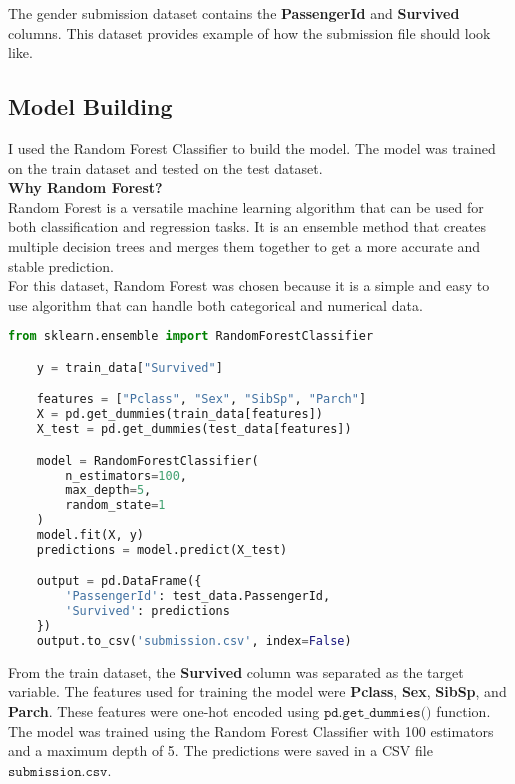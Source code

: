 \documentclass{exam}
\begin{document}
\begin{questions}
\begin{TheSolution}
        The gender submission dataset contains the \textbf{PassengerId} and \textbf{Survived} columns. This dataset provides example of how the submission file should look like.

        \subsection{Model Building}

        I used the Random Forest Classifier to build the model. The model was trained on the train dataset and tested on the test dataset. \\

        \large{\textbf{Why Random Forest?}} \\
        \normalsize
        Random Forest is a versatile machine learning algorithm that can be used for both classification and regression tasks. It is an ensemble method that creates multiple decision trees and merges them together to get a more accurate and stable prediction.\\
        For this dataset, Random Forest was chosen because it is a simple and easy to use algorithm that can handle both categorical and numerical data.

        \newpage

        \begin{lstlisting}[language=Python]
    from sklearn.ensemble import RandomForestClassifier

    y = train_data["Survived"]

    features = ["Pclass", "Sex", "SibSp", "Parch"]
    X = pd.get_dummies(train_data[features])
    X_test = pd.get_dummies(test_data[features])

    model = RandomForestClassifier(
        n_estimators=100,
        max_depth=5,
        random_state=1
    )
    model.fit(X, y)
    predictions = model.predict(X_test)

    output = pd.DataFrame({
        'PassengerId': test_data.PassengerId,
        'Survived': predictions
    })
    output.to_csv('submission.csv', index=False)
        \end{lstlisting}

        From the train dataset, the \textbf{Survived} column was separated as the target variable. The features used for training the model were \textbf{Pclass}, \textbf{Sex}, \textbf{SibSp}, and \textbf{Parch}. These features were one-hot encoded using $\texttt{pd.get\_dummies()}$ function. The model was trained using the Random Forest Classifier with 100 estimators and a maximum depth of 5. The predictions were saved in a CSV file $\texttt{submission.csv}$.


\end{TheSolution}
\end{questions}
\end{document}
